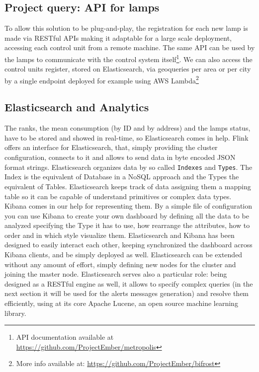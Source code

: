 \subsection*{Project query: API for lamps}
To allow this solution to be plug-and-play, the registration for each new lamp is made via RESTful APIs making it adaptable for a large scale deployment, accessing each control unit from a remote machine. The same API can be used by the lamps to communicate with the control system itself\footnote{API documentation available at \url{https://github.com/ProjectEmber/metropolis}}. We can also access the control units register, stored on Elasticsearch, via geoqueries per area or per city by a single endpoint deployed for example using AWS Lambda\footnote{More info available at: \url{https://github.com/ProjectEmber/bifrost}}

\subsection{Elasticsearch and Analytics}
The ranks, the mean consumption (by ID and by address) and the lamps status, have to be stored and showed in real-time, so Elasticsearch comes in help. Flink offers an interface for Elasticsearch, that, simply providing the cluster configuration, connects to it and allows to send data in byte encoded JSON format strings. Elasticsearch organizes data by so called \texttt{Indexes} and \texttt{Types}. The Index is the equivalent of Database in a NoSQL approach and the Types the equivalent of Tables. Elasticsearch keeps track of data assigning them a mapping table so it can be capable of understand primitives or complex data types. Kibana comes in our help for representing them. By a simple file of configuration you can use Kibana to create your own dashboard by defining all the data to be analyzed specifying the Type it has to use, how rearrange the attributes, how to order and in which style visualize them. Elasticsearch and Kibana has been designed to easily interact each other, keeping synchronized the dashboard across Kibana clients, and be simply deployed as well. Elasticsearch can be extended without any amount of effort, simply defining new nodes for the cluster and joining the master node. Elasticsearch serves also a particular role: being designed as a RESTful engine as well, it allows to specify complex queries (in the next section it will be used for the alerts messages generation) and resolve them efficiently, using at its core Apache Lucene, an open source machine learning library.

